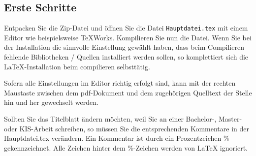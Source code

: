 \subsection{Erste Schritte}
\label{sec:ErsteSchritte}
Entpacken Sie die Zip-Datei und öffnen Sie die Datei \texttt{Hauptdatei.tex} mit einem Editor wie beispielsweise TeXWorks. 
Kompilieren Sie nun die Datei. Wenn Sie bei der Installation die sinnvolle Einstellung gewählt haben, dass beim Compilieren fehlende Bibliotheken / Quellen installiert werden sollen, so komplettiert sich die \LaTeX{}-Installation beim compilieren selbsttätig. 

Sofern alle Einstellungen im Editor richtig erfolgt sind, kann mit der rechten Maustaste zwischen dem pdf-Dokument und dem zugehörigen Quelltext der Stelle hin und her gewechselt werden. 

Sollten Sie das Titelblatt ändern möchten, weil Sie an einer Bachelor-, Master- oder KIS-Arbeit schreiben, so müssen Sie die entsprechenden Kommentare in der Hauptdatei.tex verändern. 
Ein Kommentar ist durch ein Prozentzeichen \% gekennzeichnet. 
Alle Zeichen hinter dem \%{}-Zeichen werden von \LaTeX{} ignoriert. 






